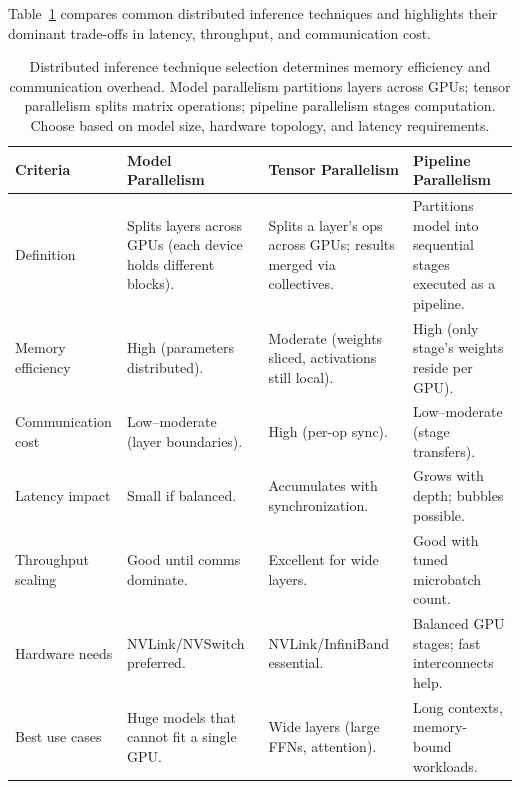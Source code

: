 Table~\ref{tab:ch06_distributed_inference} compares common distributed inference techniques and highlights their dominant trade-offs in latency, throughput, and communication cost.

\begin{table}[t]
\centering
\small
\caption{Distributed inference technique selection determines memory efficiency and communication overhead. Model parallelism partitions layers across GPUs; tensor parallelism splits matrix operations; pipeline parallelism stages computation. Choose based on model size, hardware topology, and latency requirements.}
\label{tab:ch06_distributed_inference}
\setlength{\tabcolsep}{6pt}
\renewcommand{\arraystretch}{1.3}
\begin{tabularx}{\linewidth}{@{}
  >{\raggedright\arraybackslash}p{2.8cm}
  >{\raggedright\arraybackslash}X
  >{\raggedright\arraybackslash}X
  >{\raggedright\arraybackslash}X@{}}
\toprule
\rowcolor{gray!15}
\textbf{Criteria} & \textbf{Model Parallelism} & \textbf{Tensor Parallelism} & \textbf{Pipeline Parallelism} \\
\midrule
Definition & Splits layers across GPUs (each device holds different blocks). & Splits a layer's ops across GPUs; results merged via collectives. & Partitions model into sequential stages executed as a pipeline. \\
\addlinespace[2pt]
Memory efficiency & High (parameters distributed). & Moderate (weights sliced, activations still local). & High (only stage's weights reside per GPU). \\
\addlinespace[2pt]
Communication cost & Low--moderate (layer boundaries). & High (per-op sync). & Low--moderate (stage transfers). \\
\addlinespace[2pt]
Latency impact & Small if balanced. & Accumulates with synchronization. & Grows with depth; bubbles possible. \\
\addlinespace[2pt]
Throughput scaling & Good until comms dominate. & Excellent for wide layers. & Good with tuned microbatch count. \\
\addlinespace[2pt]
Hardware needs & NVLink/NVSwitch preferred. & NVLink/InfiniBand essential. & Balanced GPU stages; fast interconnects help. \\
\addlinespace[2pt]
Best use cases & Huge models that cannot fit a single GPU. & Wide layers (large FFNs, attention). & Long contexts, memory-bound workloads. \\
\bottomrule
\end{tabularx}
\end{table}

